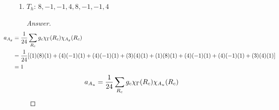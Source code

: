 \documentclass[../psets.tex]{subfiles}
\begin{document}
\begin{enumerate}[label={\Roman*)}]
\begin{enumerate}[label={\alph*)}]
\begin{proof}[Answer]
            \begin{align*}
                \hspace{-3em}a_{A_1} &= \frac{1}{24}\sum_{R_c}g_c\chi_\Gamma(R_c)\chi_{A_1}(R_c) = \frac{1}{24}[(1)(13)(1)+(8)(1)(1)+(3)(5)(1)+(6)(-3)(1)+(6)(-3)(1)] = 0\\
                \hspace{-3em}a_{A_2} &= \frac{1}{24}\sum_{R_c}g_c\chi_\Gamma(R_c)\chi_{A_2}(R_c) = \frac{1}{24}[(1)(13)(1)+(8)(1)(1)+(3)(5)(1)+(6)(-3)(-1)+(6)(-3)(-1)] = 3\\
                \hspace{-3em}a_{E}   &= \frac{1}{24}\sum_{R_c}g_c\chi_\Gamma(R_c)\chi_{E}(R_c)   = \frac{1}{24}[(1)(13)(2)+(8)(1)(-1)+(3)(5)(2)+(6)(-3)(0)+(6)(-3)(0)] = 2\\
                \hspace{-3em}a_{T_1} &= \frac{1}{24}\sum_{R_c}g_c\chi_\Gamma(R_c)\chi_{T_1}(R_c) = \frac{1}{24}[(1)(13)(3)+(8)(1)(0)+(3)(5)(-1)+(6)(-3)(1)+(6)(-3)(-1)] = 1\\
                \hspace{-3em}a_{T_2} &= \frac{1}{24}\sum_{R_c}g_c\chi_\Gamma(R_c)\chi_{T_2}(R_c) = \frac{1}{24}[(1)(13)(3)+(8)(1)(0)+(3)(5)(-1)+(6)(-3)(-1)+(6)(-3)(1)] = 1
            \end{align*}
            Therefore, we know that
            \begin{equation*}
                \Gamma = 3A_2+2E+T_1+T_2
            \end{equation*}
        \end{proof}
        \item $T_h$: $8,-1,-1,4,8,-1,-1,4$
        \begin{proof}[Answer]
            \begin{align*}
                \hspace{-4em}a_{A_g} &= \frac{1}{24}\sum_{R_c}g_c\chi_\Gamma(R_c)\chi_{A_g}(R_c)\\
                \hspace{-4em}&= \frac{1}{24}[(1)(8)(1)+(4)(-1)(1)+(4)(-1)(1)+(3)(4)(1)+(1)(8)(1)+(4)(-1)(1)+(4)(-1)(1)+(3)(4)(1)]\\
                \hspace{-4em}&= 1
            \end{align*}
            \begin{align*}
                \hspace{-4em}a_{A_u} &= \frac{1}{24}\sum_{R_c}g_c\chi_\Gamma(R_c)\chi_{A_u}(R_c)\\

\end{align*}
\end{proof}
\end{enumerate}
\end{enumerate}
\end{document}
